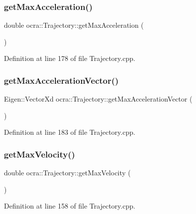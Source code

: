 \subsubsection{\texorpdfstring{get\+Max\+Acceleration()}{getMaxAcceleration()}}
{\footnotesize\ttfamily double ocra\+::\+Trajectory\+::get\+Max\+Acceleration (\begin{DoxyParamCaption}{ }\end{DoxyParamCaption})}



Definition at line 178 of file Trajectory.\+cpp.

\hypertarget{classocra_1_1Trajectory_aaa40e685df5caf6f4d81d08b47d82301}{}\label{classocra_1_1Trajectory_aaa40e685df5caf6f4d81d08b47d82301} 
\subsubsection{\texorpdfstring{get\+Max\+Acceleration\+Vector()}{getMaxAccelerationVector()}}
{\footnotesize\ttfamily Eigen\+::\+Vector\+Xd ocra\+::\+Trajectory\+::get\+Max\+Acceleration\+Vector (\begin{DoxyParamCaption}{ }\end{DoxyParamCaption})}



Definition at line 183 of file Trajectory.\+cpp.

\hypertarget{classocra_1_1Trajectory_a2c7cba3382416e42cbf7a931b8c9e0ef}{}\label{classocra_1_1Trajectory_a2c7cba3382416e42cbf7a931b8c9e0ef} 
\subsubsection{\texorpdfstring{get\+Max\+Velocity()}{getMaxVelocity()}}
{\footnotesize\ttfamily double ocra\+::\+Trajectory\+::get\+Max\+Velocity (\begin{DoxyParamCaption}{ }\end{DoxyParamCaption})}



Definition at line 158 of file Trajectory.\+cpp.

\hypertarget{classocra_1_1Trajectory_a8cdf985ffe59a3d00f7967035f79376d}{}\label{classocra_1_1Trajectory_a8cdf985ffe59a3d00f7967035f79376d} 

